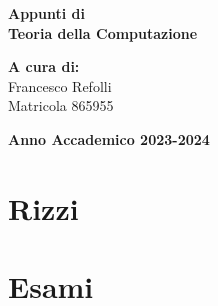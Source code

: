 \documentclass[a4paper,11pt,oneside]{book}
\begin{document}
    
    \begin{titlepage}
        
	\vspace{40mm}
        
	\begin{center}
            {\LARGE{
                    \textbf{Appunti di \\ Teoria della Computazione}
                    \par
            }}
        \end{center}
        
        \vspace{50mm}

        \begin{flushright}
            {\large \textbf{A cura di:}} \\
            \large{Francesco Refolli} \\
            \large{Matricola 865955} 
        \end{flushright}
        
        \vspace{40mm}
        \begin{center}
            {\large{\bf Anno Accademico 2023-2024}}
        \end{center}

        \restoregeometry
        
    \end{titlepage}
    
    \printindex
    
    \part{Rizzi}
    
    
    
    
    
    
    
    
    \part{Esami}
    
\end{document}
